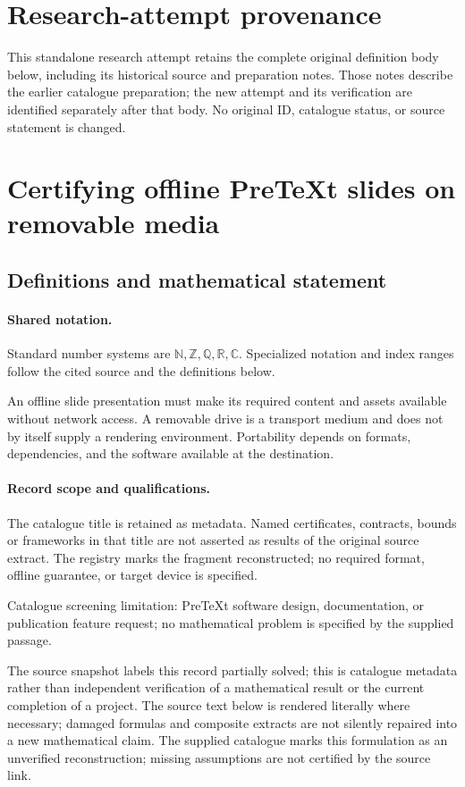 \documentclass[11pt]{article}
\begin{document}
\section*{Research-attempt provenance}
This standalone research attempt retains the complete original definition body below,
including its historical source and preparation notes. Those notes describe the
earlier catalogue preparation; the new attempt and its verification are identified
separately after that body. No original ID, catalogue status, or source statement is changed.

\section{Certifying offline PreTeXt slides on removable media}\label{statement}

\subsection{Definitions and mathematical statement}

\paragraph{Shared notation.}Standard number systems are $\mathbb N,\mathbb Z,\mathbb Q,\mathbb R,\mathbb C$. Specialized notation and index ranges follow the cited source and the definitions below.


An offline slide presentation must make its required content and assets available without network access. A removable drive is a transport medium and does not by itself supply a rendering environment. Portability depends on formats, dependencies, and the software available at the destination.
\paragraph{Record scope and qualifications.}
The catalogue title is retained as metadata. Named certificates, contracts, bounds or frameworks in that title are not asserted as results of the original source extract.
The registry marks the fragment reconstructed; no required format, offline guarantee, or target device is specified.

Catalogue screening limitation: PreTeXt software design, documentation, or publication feature request; no mathematical problem is specified by the supplied passage.

The source snapshot labels this record partially solved; this is catalogue metadata rather than independent verification of a mathematical result or the current completion of a project.
The source text below is rendered literally where necessary; damaged formulas and composite extracts are not silently repaired into a new mathematical claim.
The supplied catalogue marks this formulation as an unverified reconstruction; missing assumptions are not certified by the source link.
\end{document}
